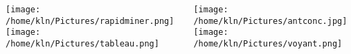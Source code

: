 \documentclass[8pt]{beamer}
\begin{document}
\begin{frame}
\begin{columns}
\begin{column}{0.5\textwidth}
   \begin{center}
    \texttt{[image: /home/kln/Pictures/rapidminer.png]}\\
    \bigskip
    \texttt{[image: /home/kln/Pictures/tableau.png]}
    \end{center}
\end{column}
\begin{column}{0.5\textwidth}
    \begin{center}
    \texttt{[image: /home/kln/Pictures/antconc.jpg]}\\
    \bigskip
    \texttt{[image: /home/kln/Pictures/voyant.png]}
    \end{center}
\end{column}
\end{columns}
\end{frame}
\end{document}
